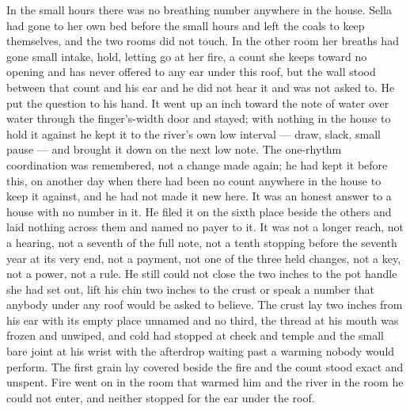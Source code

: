 In the small hours there was no breathing number anywhere in the house. Sella had gone to her own bed before the small hours and left the coals to keep themselves, and the two rooms did not touch. In the other room her breaths had gone small intake, hold, letting go at her fire, a count she keeps toward no opening and has never offered to any ear under this roof, but the wall stood between that count and his ear and he did not hear it and was not asked to. He put the question to his hand. It went up an inch toward the note of water over water through the finger's-width door and stayed; with nothing in the house to hold it against he kept it to the river's own low interval --- draw, slack, small pause --- and brought it down on the next low note. The one-rhythm coordination was remembered, not a change made again; he had kept it before this, on another day when there had been no count anywhere in the house to keep it against, and he had not made it new here. It was an honest answer to a house with no number in it. He filed it on the sixth place beside the others and laid nothing across them and named no payer to it. It was not a longer reach, not a hearing, not a seventh of the full note, not a tenth stopping before the seventh year at its very end, not a payment, not one of the three held changes, not a key, not a power, not a rule. He still could not close the two inches to the pot handle she had set out, lift his chin two inches to the crust or speak a number that anybody under any roof would be asked to believe. The crust lay two inches from his ear with its empty place unnamed and no third, the thread at his mouth was frozen and unwiped, and cold had stopped at cheek and temple and the small bare joint at his wrist with the afterdrop waiting past a warming nobody would perform. The first grain lay covered beside the fire and the count stood exact and unspent. Fire went on in the room that warmed him and the river in the room he could not enter, and neither stopped for the ear under the roof.
